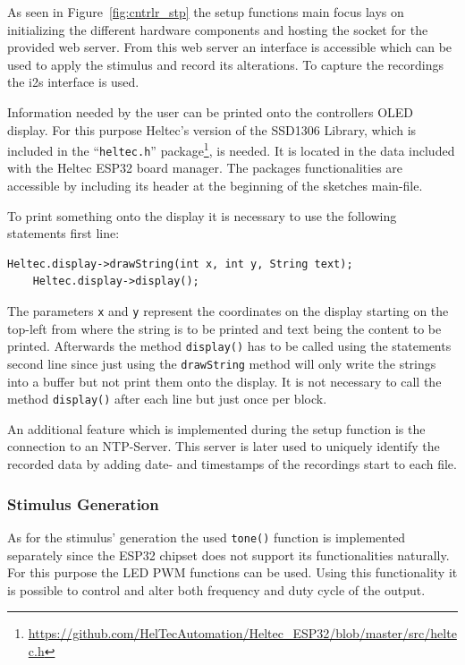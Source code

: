 As seen in Figure~\ref{fig:cntrlr_stp} the setup functions main focus lays on initializing the different hardware components and hosting the socket for the provided web server.
From this web server an interface is accessible which can be used to apply the stimulus and record its alterations.
To capture the recordings the i2s interface is used.

Information needed by the user can be printed onto the controllers OLED display.
For this purpose Heltec's version of the SSD1306 Library, which is included in the \enquote{\texttt{heltec.h}} package\footnote{\url{https://github.com/HelTecAutomation/Heltec_ESP32/blob/master/src/heltec.h}}, is needed.
It is located in the data included with the Heltec ESP32 board manager.
The packages functionalities are accessible by including its header at the beginning of the sketches main-file.

To print something onto the display it is necessary to use the following statements first line:
\begin{lstlisting}[style=inText]
	Heltec.display->drawString(int x, int y, String text);
	Heltec.display->display();
\end{lstlisting}
The parameters \texttt{x} and \texttt{y} represent the coordinates on the display starting on the top-left from where the string is to be printed and text being the content to be printed.
Afterwards the method \texttt{display()} has to be called using the  statements second line since just using the \texttt{drawString} method will only write the strings into a buffer but not print them onto the
display.
It is not necessary to call the method \texttt{display()} after each line but just once per block.

An additional feature which is implemented during the setup function is the connection to an NTP-Server.
This server is later used to uniquely identify the recorded data by adding date- and timestamps of the recordings start to each file.

\subsubsection{Stimulus Generation}
As for the stimulus' generation the used \texttt{tone()} function is implemented separately since the ESP32 chipset does not support its functionalities naturally.
For this purpose the LED PWM functions can be used.
Using this functionality it is possible to control and alter both frequency and duty cycle of the output.

